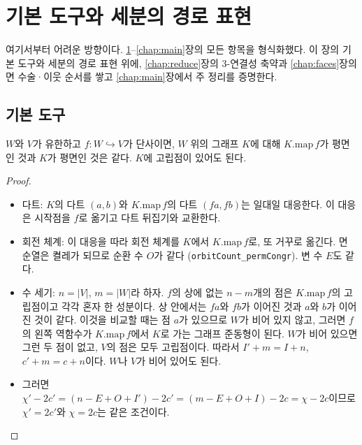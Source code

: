 \chapter{기본 도구와 세분의 경로 표현}
\label{chap:tools}

여기서부터 어려운 방향이다. \ref{chap:tools}--\ref{chap:main}장의 모든 항목을 형식화했다.
이 장의 기본 도구와 세분의 경로 표현 위에, \ref{chap:reduce}장의 3-연결성 축약과
\ref{chap:faces}장의 면 수술·이웃 순서를 쌓고 \ref{chap:main}장에서 주 정리를 증명한다.

\section{기본 도구}

\begin{lemma}
\label{lem:map_iff}
\leanok
\(W\)와 \(V\)가 유한하고 \(f : W \hookrightarrow V\)가 단사이면, \(W\) 위의 그래프 \(K\)에 대해
\(K.\mathrm{map}\,f\)가 평면인 것과 \(K\)가 평면인 것은 같다. \(K\)에 고립점이 있어도 된다.
\end{lemma}

\begin{proof}
\leanok
\begin{itemize}
  \item 다트: \(K\)의 다트 \((a, b)\)와 \(K.\mathrm{map}\,f\)의 다트 \((f a, f b)\)는 일대일 대응한다. 이 대응은
        시작점을 \(f\)로 옮기고 다트 뒤집기와 교환한다.
  \item 회전 체계: 이 대응을 따라 회전 체계를 \(K\)에서 \(K.\mathrm{map}\,f\)로, 또 거꾸로 옮긴다. 면 순열은
        켤레가 되므로 순환 수 \(O\)가 같다 (\texttt{orbitCount\_permCongr}). 변 수 \(E\)도 같다.
  \item 수 세기: \(n = |V|\), \(m = |W|\)라 하자. \(f\)의 상에 없는 \(n - m\)개의 점은 \(K.\mathrm{map}\,f\)의
        고립점이고 각각 혼자 한 성분이다. 상 안에서는 \(f a\)와 \(f b\)가 이어진 것과 \(a\)와 \(b\)가
        이어진 것이 같다. 이것을 비교할 때는 점 \(a\)가 있으므로 \(W\)가 비어 있지 않고, 그러면 \(f\)의 왼쪽
        역함수가 \(K.\mathrm{map}\,f\)에서 \(K\)로 가는 그래프 준동형이 된다. \(W\)가 비어 있으면 그런 두 점이
        없고, \(V\)의 점은 모두 고립점이다. 따라서 \(I' + m = I + n\), \(c' + m = c + n\)이다.
        \(W\)나 \(V\)가 비어 있어도 된다.
  \item 그러면 \(\chi' - 2c' = (n - E + O + I') - 2c' = (m - E + O + I) - 2c = \chi - 2c\)이므로
        \(\chi' = 2c'\)와 \(\chi = 2c\)는 같은 조건이다.
\end{itemize}
\end{proof}

